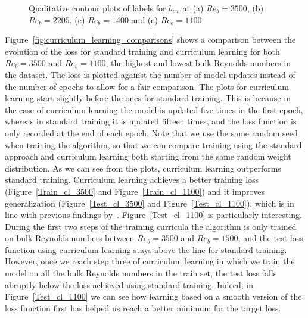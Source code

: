 \documentclass[11pt]{article}
\numberwithin{equation}{section}
\theoremstyle{plain}
\theoremstyle{definition}
\begin{document}
\begin{figure}[htbp!]
\centering
{}
\caption{Qualitative contour plots of labels for $b_{vw}$ at (a) $Re_{b}=3500$, (b) $Re_{b}=2205$, (c) $Re_{b}=1400$ and (e) $Re_{b}=1100$.}
\label{fig:vw_for_different_Reynolds}
\end{figure}




Figure~\ref{fig:curriculum_learning_comparisons} shows a comparison between the evolution of the loss for standard training and curriculum learning for both $Re_{b}=3500$ and $Re_{b}=1100$, the highest and lowest bulk Reynolds numbers in the dataset. The loss is plotted against the number of model updates instead of the number of epochs to allow for a fair comparison. The plots for curriculum learning start slightly before the ones for standard training. This is because in the case of curriculum learning the model is updated five times in the first epoch, whereas in standard training it is updated fifteen times, and the loss function is only recorded at the end of each epoch. Note that we use the same random seed when training the algorithm, so that we can compare training using the standard approach and curriculum learning both starting from the same random weight distribution. As we can see from the plots, curriculum learning outperforms standard training. Curriculum learning achieves a better training loss (Figure~\ref{Train_cl_3500} and Figure~\ref{Train_cl_1100}) and it improves generalization (Figure~\ref{Test_cl_3500} and Figure~\ref{Test_cl_1100}), which is in line with previous findings by~\cite{cl_bengio}. Figure~\ref{Test_cl_1100} is particularly interesting. During the first two steps of the training curricula the algorithm is only trained on bulk Reynolds numbers between $Re_{b}=3500$ and $Re_{b}=1500$, and the test loss function using curriculum learning stays above the line for standard training. However, once we reach step three of curriculum learning in which we train the model on all the bulk Reynolds numbers in the train set, the test loss falls abruptly below the loss achieved using standard training. Indeed, in Figure~\ref{Test_cl_1100} we can see how learning based on a smooth version of the loss function first has helped us reach a better minimum for the target loss.
\end{document}
